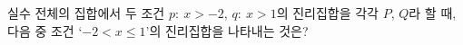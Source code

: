 실수 전체의 집합에서 두 조건 $p:\ x>-2$, $q:\ x>1$의 진리집합을 각각 $P$, $Q$라 할 때, 다음 중 조건 ‘$-2<x\le 1$’의 진리집합을 나타내는 것은?

